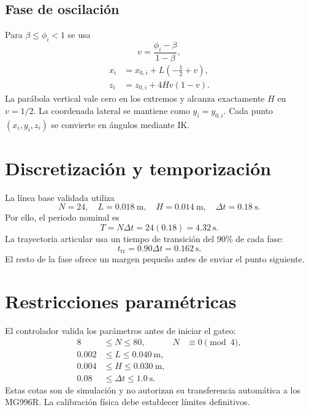 \documentclass[11pt,a4paper]{article}
\begin{document}
\subsection{Fase de oscilación}
Para $\beta\le\phi_i<1$ se usa
\[
v=\frac{\phi_i-\beta}{1-\beta},
\]
\begin{align}
x_i &= x_{0,i}+L\left(-\frac12+v\right),\\
z_i &= z_{0,i}+4H v(1-v).
\end{align}
La parábola vertical vale cero en los extremos y alcanza exactamente $H$ en
$v=1/2$. La coordenada lateral se mantiene como $y_i=y_{0,i}$. Cada punto
$(x_i,y_i,z_i)$ se convierte en ángulos mediante IK.

\section{Discretización y temporización}
La línea base validada utiliza
\[
N=24,\quad L=0.018\ \text{m},\quad H=0.014\ \text{m},
\quad \Delta t=0.18\ \text{s}.
\]
Por ello, el periodo nominal es
\[
\boxed{T=N\Delta t=24(0.18)=4.32\ \text{s}}.
\]
La trayectoria articular usa un tiempo de transición del $90\%$ de cada fase:
\[
t_{\mathrm{tr}}=0.90\Delta t=0.162\ \text{s}.
\]
El resto de la fase ofrece un margen pequeño antes de enviar el punto siguiente.

\section{Restricciones paramétricas}
El controlador valida los parámetros antes de iniciar el gateo:
\begin{align*}
8&\le N\le80, & N&\equiv0\pmod4,\\
0.002&\le L\le0.040\ \text{m},\\
0.004&\le H\le0.030\ \text{m},\\
0.08&\le\Delta t\le1.0\ \text{s}.
\end{align*}
Estas cotas son de simulación y no autorizan su transferencia automática a los
MG996R. La calibración física debe establecer límites definitivos.
\end{document}
